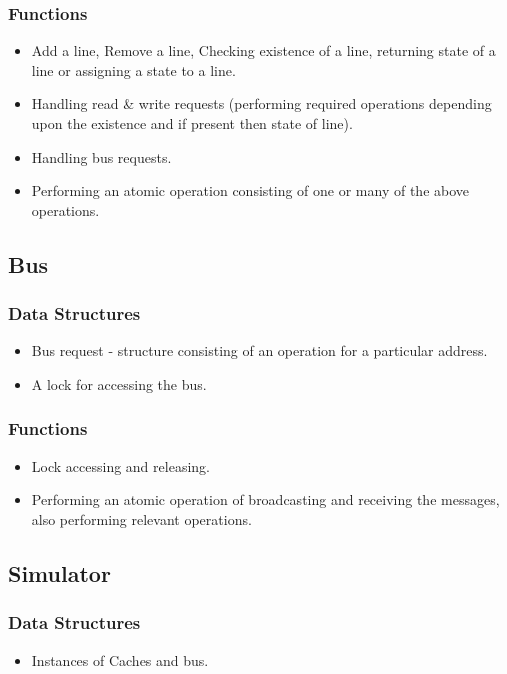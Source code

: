 \documentclass{article}
\begin{document}
\subsubsection*{Functions}
\begin{itemize}
\item Add a line, Remove a line, Checking existence of a line, returning state of a line or assigning a state to a line.
\item Handling read \& write requests (performing required operations depending upon the existence and if present then state of line).
\item Handling bus requests.
\item Performing an atomic operation consisting of one or many of the above operations.
\end{itemize}
\subsection{Bus}
\subsubsection*{Data Structures}
\begin{itemize}
\item Bus request - structure consisting of an operation for a particular address.
\item A lock for accessing the bus.
\end{itemize}
\subsubsection*{Functions}
\begin{itemize}
\item Lock accessing and releasing.
\item Performing an atomic operation of broadcasting and receiving the messages, also performing relevant operations.
\end{itemize}
\subsection{Simulator}
\subsubsection*{Data Structures}
\begin{itemize}
\item Instances of Caches and bus.
\end{itemize}
\end{document}
